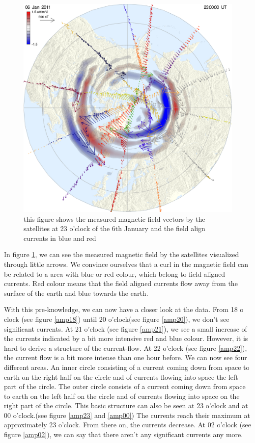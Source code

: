 \documentclass[10pt,a4paper]{article}
\begin{document}
\begin{figure}[h]
\centering
\includegraphics[scale=0.3]{summary_better_exp.pdf}
\caption{this figure shows the measured magnetic field vectors by the satellites at 23 o'clock of the 6th January and the field align currents in blue and red}
\label{AMPERE_explonation}
\end{figure}
In figure \ref{AMPERE_explonation}, we can see the measured magnetic field by the satellites visualized through little arrows. We convince ourselves that a curl in the 
magnetic field can be related to a area with blue or red colour, which belong to field aligned currents. Red colour means that the field aligned currents flow away from 
the surface of the earth and blue towards the earth. 


With this pre-knowledge, we can now have a closer look at the data. From 18 o clock (see figure \ref{amp18}) until 20 o'clock(see figure \ref{amp20}), we don't see 
significant currents. At 21 o'clock (see figure \ref{amp21}), we see a small increase of the currents indicated by a bit more intensive red and blue colour. However, 
it is hard to derive a structure of the current-flow. At 22 o'clock (see figure \ref{amp22}), the current flow is a bit more intense than one hour before. We can now 
see four different areas. An inner circle consisting of a current coming down from space to earth on the right half on the circle and of currents flowing into space 
the left part of the circle. The outer circle consists of a current coming down from space to earth on the left half on the circle and of currents flowing into space 
on the right part of the circle. This basic structure can also be seen at 23 o'clock and at 00 o'clock.(see figure \ref{amp23} and \ref{amp00}) 
The currents reach their maximum at approximately 23 o'clock. From there on, the currents decrease. At 02 o'clock (see figure \ref{amp02}), we can say that there aren't
any significant currents any more. 
\end{document}

